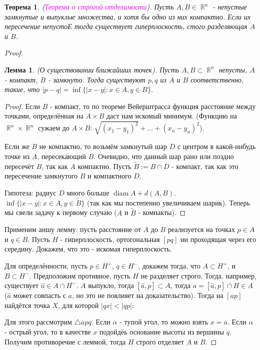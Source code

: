 \documentclass[a4paper,100pt]{article}
\theoremstyle{indented}
\newtheorem{theorem}{Теорема}
\newtheorem{lemma}{Лемма}
\theoremstyle{definition}
\theoremstyle{remark}
\DeclareMathOperator{\diam}{diam}
\DeclareMathOperator{\RR}{\mathbb{R}}
\begin{document}
\begin{theorem}
    (\textit{\textcolor{magenta}{\hypertarget{s99}{Теорема о строгой отделимости}}}). Пусть $A, B \in \RR^n$ - непустые замкнутые и выпуклые множества, и хотя бы одно из них компактно. Если их пересечение непустоЕ тогда существует гиперплоскость, стого разделяющая $A$ и $B$. 
\end{theorem}

\begin{proof}

    \begin{lemma}
        (О существовании ближайших точек). Пусть $A, B \subset \RR^n$ непусты, $A$ - компакт, $B$ - замкнуто. Тогда существуют $p, q$ из $A$ и $B$ соответственно, такие, что $|p-q| = \inf \{|x-y|: x \in A, y \in B\}$. 
    \end{lemma}

    \begin{proof}
        Если $B$ - компакт, то по теореме Вейерштрасса функция расстояние между точками, определённая на $A \times B$ даст нам искомый минимум. (Функцию на $\RR^n \times \RR^n$ сужаем до $A \times B$: $\sqrt{(x_1-y_1)^2}+ \ldots + (x_n-y_n)^2$). \ 

        Если же $B$ не компактно, то возьмём замкнутый шар $D$ с центром в какой-нибудь точке из $A$, пересекающий $B$. Очевидно, что данный шар рано или поздно пересечёт $B$, так как $A$ компактно. Пусть $\tilde{B} := B \cap D$ - компакт, так как это пересечение замкнутого $B$ и компактного $D$. \ 

        Гипотеза: радиус $D$ много больше $\diam A + d(A, B)$. $\inf \{|x-y| : x \in A, y \in \tilde{B}\}$ (так как мы постепенно увеличиваем шарик). Теперь мы свели задачу к первому случаю ($A$ и $\tilde{B}$ - компакты).
    \end{proof}

    Применим аншу лемму: пусть расстояние от $A$ до $B$ реализуется на точках $p \in A$ и $q \in B$. Пусть $H$ - гиперплоскость, ортогональная $[pq]$ ии проходящая через его середину. Докажем, что это - искомая гиперплоскость. \ 

    Для определённости, пусть $p \in H^+$, $q \in H^-$, докажем тогда, что $A \subset  H^+$, и $B \subset H^-$. Предположим противное, пусть $H$ не разделяет строго. Тогда, например, существует $\hat{a} \in A \cap \overline{H^-}$. $A$ выпукло, тогда $[\hat{a}, p] \subset A$, тогда $a = [\hat{a}, p] \cap H \in A$ ($\hat{a}$ может совпасть с $a$, но это не повлияет на доказательство). Тогда на $[ap]$ найдётся точка $X$, для которой $|qx|< |qp|$: \ 

    Для этого рассмотрим $\triangle apq$. Если $\alpha$ - тупой угол, то можно взять $x = a$. Если $\alpha$ - острый угол, то в качестве $x$ подойдёь основание высоты из вершины $q$. Получим противоречие с леммой, тогда $H$ строго отделяет $A$ и $B$. 
   
\end{proof}
\end{document}
